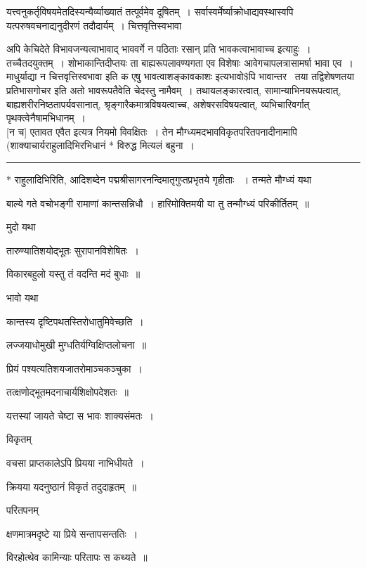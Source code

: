 \documentclass[11pt, openany]{book}
\begin{document}
यत्त्वनुकर्तृविषयमेतदिस्यन्यैर्व्याख्यातं तत्पूर्वमेव दूषितम्~। सर्वास्वर्मेर्ष्याक्रोधाद्यवस्थास्वपि यत्परुषवचनाद्यनुदीरणं तदौदार्यम्~। चित्तवृत्तिस्वभावा 

\newpage

\noindent
अपि केचिदेते विभावजन्यत्वाभावाद् भाववर्गे न पठिताः रसान् प्रति भावकत्वाभावाच्च इत्याहुः~। तच्चैतदयुक्तम्~। शोभाकान्तिदीप्तयः ता बाह्यरूपलावण्यगता एव विशेषाः आवेगचापलत्रासामर्षा भावा एव~। माधुर्याद्या न {चित्तवृत्तिस्वभावा इति क एषु भावत्वाशङ्कावकाशः इत्यभावो\$पि भावान्तर\textendash\ } तया तद्विशेषणतया प्रतिभासगोचर इति अतो भावरूपतैवेति चेदस्तु नामैवम्~। तथायलङ्कारत्वात्, सामान्याभिनयरूपत्वात्, बाह्यशरीरनिष्ठतापर्यवसानात्, श्रृङ्गारैकमात्रविषयत्वाच्च, अशेषरसविषयत्वात्, व्यभिचारिवर्गात् पृथक्त्वेनैषामभिधानम्~।\\ 

[न च] एतावत एवैत इत्यत्र नियमो विवक्षितः~। तेन मौग्ध्यमदभावविकृतपरितपनादीनामापि (शाक्याचार्यराहुलादिभिरभिधानं * विरुद्ध मित्यलं बहुना~।

\hrule

\vspace{2mm}

* राहुलादिभिरिति, आदिशब्देन पद्मश्रीसागरनन्दिमातृगुप्तप्रभृतये गृहीताः ~। तन्मते मौग्ध्यं यथा\textendash\ 


बाल्ये गते वचोभङ्गी रामाणां कान्तसन्निधौ~। 
हारिमोक्तिमयी या तु तन्मौग्ध्यं परिकीर्तितम्~॥ 

मुदो यथा\textendash\ 

 तारुण्यातिशयोद्भूतः सुरापानविशेषितः~। 

 विकारबहुलो यस्तु तं वदन्ति मदं बुधाः~॥ 

भावो यथा\textendash\ 

 कान्तस्य दृष्टिपथतस्तिरोधातुमिवेच्छति~। 

 लज्जयाधोमुखी मुग्धतिर्यग्विक्षिप्तलोचना~॥ 

 प्रियं पश्यत्यतिशयजातरोमाञ्चकञ्चुका~। 

 तत्क्षणोद्भूतमदनाचार्यशिक्षोपदेशतः~॥ 

 यत्तस्यां जायते चेष्टा स भावः शाक्यसंमतः~। 

विकृतम्\textendash\ 

 वचसा प्राप्तकालेऽपि प्रियया नाभिधीयते~। 

 क्रियया यदनुष्ठानं विकृतं तदुदाहृतम्~॥ 

परितपनम्\textendash\ 

 क्षणमात्रमदृष्टे या प्रिये सन्तापसन्ततिः~। 

 विरहोत्थेव कामिन्याः परितापः स कथ्यते~॥ 
\end{document}
